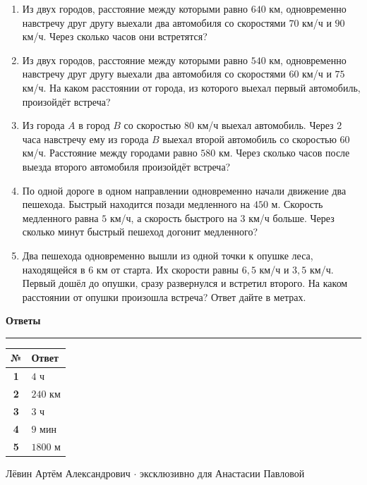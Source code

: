 \documentclass[a4paper,12pt]{article}
\newcommand{\sectiontitle}[1]{%
  \Needspace{6\baselineskip}%
  \vspace{0.25em}%
  {\Large\bfseries\color{darkaccent}#1}\par
  \vspace{0.25em}%
  \textcolor{rulegray}{\rule{\linewidth}{0.6pt}}%
  \vspace{0.35em}%
}
\begin{document}
\begin{enumerate}[label=\textbf{\arabic*.},leftmargin=2.1em,itemsep=0.85em,topsep=0.4em]
  \item Из двух городов, расстояние между которыми равно \(640\) км,
  одновременно навстречу друг другу выехали два автомобиля со скоростями
  \(70\) км/ч и \(90\) км/ч. Через сколько часов они встретятся?

  \item Из двух городов, расстояние между которыми равно \(540\) км,
  одновременно навстречу друг другу выехали два автомобиля со скоростями
  \(60\) км/ч и \(75\) км/ч. На каком расстоянии от города, из которого выехал
  первый автомобиль, произойдёт встреча?

  \item Из города \(A\) в город \(B\) со скоростью \(80\) км/ч выехал автомобиль.
  Через \(2\) часа навстречу ему из города \(B\) выехал второй автомобиль
  со скоростью \(60\) км/ч. Расстояние между городами равно \(580\) км.
  Через сколько часов после выезда второго автомобиля произойдёт встреча?

  \item По одной дороге в одном направлении одновременно начали движение два пешехода.
  Быстрый находится позади медленного на \(450\) м. Скорость медленного равна
  \(5\) км/ч, а скорость быстрого на \(3\) км/ч больше.
  Через сколько минут быстрый пешеход догонит медленного?

  \item Два пешехода одновременно вышли из одной точки к опушке леса,
  находящейся в \(6\) км от старта. Их скорости равны \(6{,}5\) км/ч и \(3{,}5\) км/ч.
  Первый дошёл до опушки, сразу развернулся и встретил второго.
  На каком расстоянии от опушки произошла встреча? Ответ дайте в метрах.
\end{enumerate}

\clearpage
\sectiontitle{Ответы}

\begin{center}
\renewcommand{\arraystretch}{1.45}
\begin{tabularx}{0.72\linewidth}{@{}>{\bfseries}cX@{}}
\toprule
№ & Ответ\\
\midrule
1 & \(4\) ч\\
2 & \(240\) км\\
3 & \(3\) ч\\
4 & \(9\) мин\\
5 & \(1800\) м\\
\bottomrule
\end{tabularx}
\end{center}

\vfill

\begin{center}
\textcolor{softgray}{\small
Лёвин Артём Александрович \(\cdot\) эксклюзивно для Анастасии Павловой}
\end{center}
\end{document}
